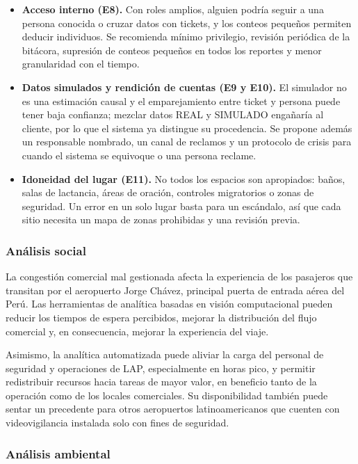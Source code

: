 \documentclass[12pt,a4paper]{article}
\begin{document}
\begin{itemize}
    \item \textbf{Acceso interno (E8).} Con roles amplios, alguien podría seguir
    a una persona conocida o cruzar datos con tickets, y los conteos pequeños
    permiten deducir individuos. Se recomienda mínimo privilegio, revisión
    periódica de la bitácora, supresión de conteos pequeños en todos los
    reportes y menor granularidad con el tiempo.

    \item \textbf{Datos simulados y rendición de cuentas (E9 y E10).} El
    simulador no es una estimación causal y el emparejamiento entre ticket y
    persona puede tener baja confianza; mezclar datos REAL y SIMULADO engañaría
    al cliente, por lo que el sistema ya distingue su procedencia. Se propone
    además un responsable nombrado, un canal de reclamos y un protocolo de crisis para
    cuando el sistema se equivoque o una persona reclame.

    \item \textbf{Idoneidad del lugar (E11).} No todos los espacios son
    apropiados: baños, salas de lactancia, áreas de oración, controles
    migratorios o zonas de seguridad. Un error en un solo lugar basta para un
    escándalo, así que cada sitio necesita un mapa de zonas prohibidas y una
    revisión previa.
\end{itemize}

\subsubsection{Análisis social}

La congestión comercial mal gestionada afecta la experiencia de los
pasajeros que transitan por el aeropuerto Jorge Chávez, principal puerta
de entrada aérea del Perú. Las herramientas de
analítica basadas en visión computacional pueden reducir los tiempos de
espera percibidos, mejorar la distribución del flujo comercial y, en
consecuencia, mejorar la experiencia del viaje.

Asimismo, la analítica automatizada puede aliviar la carga del personal
de seguridad y operaciones de LAP, especialmente en horas pico, y
permitir redistribuir recursos hacia tareas de mayor valor, en beneficio
tanto de la operación como de los locales comerciales. Su disponibilidad
también puede sentar un precedente para otros aeropuertos
latinoamericanos que cuenten con videovigilancia instalada solo con fines
de seguridad.

\subsubsection{Análisis ambiental}
\end{document}
